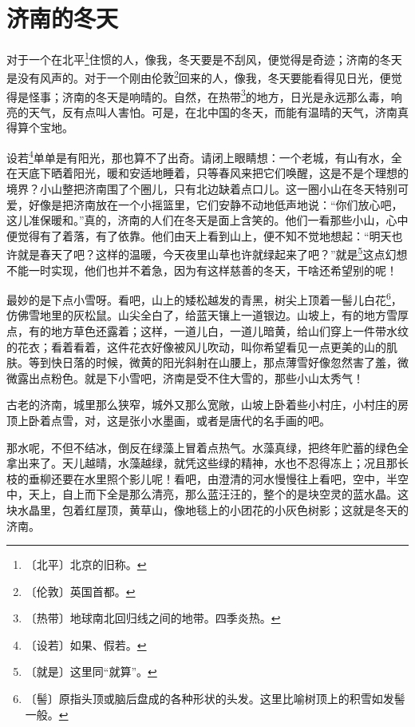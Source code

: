 \documentclass[12pt,UTF-8,openany]{ctexbook}
\begin{document}
\chapter{济南的冬天}

\begin{large}
    
    对于一个在北平\footnote{〔北平〕北京的旧称。}住惯的人，像我，冬天要是不刮风，便觉得是奇迹；济南的冬天是没有风声的。对于一个刚由伦敦\footnote{〔伦敦〕英国首都。}回来的人，像我，冬天要能看得见日光，便觉得是怪事；济南的冬天是响晴的。自然，在热带\footnote{〔热带〕地球南北回归线之间的地带。四季炎热。}的地方，日光是永远那么毒，响亮的天气，反有点叫人害怕。可是，在北中国的冬天，而能有温晴的天气，济南真得算个宝地。
    
    设若\footnote{〔设若〕如果、假若。}单单是有阳光，那也算不了出奇。请闭上眼睛想：一个老城，有山有水，全在天底下晒着阳光，暖和安适地睡着，只等春风来把它们唤醒，这是不是个理想的境界？小山整把济南围了个圈儿，只有北边缺着点口儿。这一圈小山在冬天特别可爱，好像是把济南放在一个小摇篮里，它们安静不动地低声地说：“你们放心吧，这儿准保暖和。”真的，济南的人们在冬天是面上含笑的。他们一看那些小山，心中便觉得有了着落，有了依靠。他们由天上看到山上，便不知不觉地想起：“明天也许就是春天了吧？这样的温暖，今天夜里山草也许就绿起来了吧？”就是\footnote{〔就是〕这里同“就算”。}这点幻想不能一时实现，他们也并不着急，因为有这样慈善的冬天，干啥还希望别的呢！
    
    最妙的是下点小雪呀。看吧，山上的矮松越发的青黑，树尖上顶着一髻儿白花\footnote{〔髻〕原指头顶或脑后盘成的各种形状的头发。这里比喻树顶上的积雪如发髻一般。}，仿佛雪地里的灰松鼠。山尖全白了，给蓝天镶上一道银边。山坡上，有的地方雪厚点，有的地方草色还露着；这样，一道儿白，一道儿暗黄，给山们穿上一件带水纹的花衣；看着看着，这件花衣好像被风儿吹动，叫你希望看见一点更美的山的肌肤。等到快日落的时候，微黄的阳光斜射在山腰上，那点薄雪好像忽然害了羞，微微露出点粉色。就是下小雪吧，济南是受不住大雪的，那些小山太秀气！
    
    古老的济南，城里那么狭窄，城外又那么宽敞，山坡上卧着些小村庄，小村庄的房顶上卧着点雪，对，这是张小水墨画，或者是唐代的名手画的吧。
    
    那水呢，不但不结冰，倒反在绿藻上冒着点热气。水藻真绿，把终年贮蓄的绿色全拿出来了。天儿越晴，水藻越绿，就凭这些绿的精神，水也不忍得冻上；况且那长枝的垂柳还要在水里照个影儿呢！看吧，由澄清的河水慢慢往上看吧，空中，半空中，天上，自上而下全是那么清亮，那么蓝汪汪的，整个的是块空灵的蓝水晶。这块水晶里，包着红屋顶，黄草山，像地毯上的小团花的小灰色树影；这就是冬天的济南。
    
\end{large}
\end{document}
